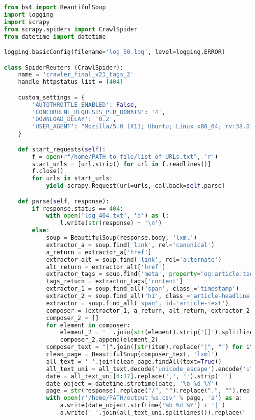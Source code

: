 \documentclass[12pt]{article}
\begin{document}
\begin{lstlisting}[language=Python,title=\textbf{Reuters data scraping.}]
from bs4 import BeautifulSoup
import logging
import scrapy
from scrapy.spiders import CrawlSpider
from datetime import datetime

logging.basicConfig(filename='log_50.log', level=logging.ERROR)

class SpiderReuters (CrawlSpider):
    name = 'crawler_final_v21_tags_2'
    handle_httpstatus_list = [404]

    custom_settings = {
        'AUTOTHROTTLE_ENABLED': False,
        'CONCURRENT_REQUESTS_PER_DOMAIN': '4',
        'DOWNLOAD_DELAY': '0.2',
        'USER_AGENT': "Mozilla/5.0 (X11; Ubuntu; Linux x86_64; rv:38.0) Gecko/20100101 Firefox/38.0"
    }

    def start_requests(self):
        f = open(r"/home/PATH-to-file/list_of_URLs.txt", 'r')
        start_urls = [url.strip() for url in f.readlines()]
        f.close()
        for urls in start_urls:
            yield scrapy.Request(url=urls, callback=self.parse)

    def parse(self, response):
        if response.status == 404:
            with open('log_404.txt', 'a') as l:
                l.write(str(response) + '\n')
        else:
            soup = BeautifulSoup(response.body, 'lxml')
            extractor_a = soup.find('link', rel='canonical')
            a_return = extractor_a['href']
            extractor_alt = soup.find('link', rel='alternate')
            alt_return = extractor_alt['href']
            extractor_tags = soup.find('meta', property="og:article:tag")
            tags_return = extractor_tags['content']
            extractor_1 = soup.find_all('span', class_='timestamp')
            extractor_2 = soup.find_all('h1', class_='article-headline')
            extractor = soup.find_all('span', id='article-text')
            composer = [extractor_1, a_return, alt_return, extractor_2, extractor, tags_return]
            composer_2 = []
            for element in composer:
                element_2 = ' '.join(str(element).strip('[]').splitlines())
                composer_2.append(element_2)
            composer_text = "|".join([str(item).replace("|", "") for item in composer_2])
            clean_page = BeautifulSoup(composer_text, 'lxml')
            all_text = ' '.join(clean_page.findAll(text=True))
            all_text_uni = all_text.decode('unicode_escape').encode('utf-8', 'strict')
            date = all_text_uni[4:17].replace(',', '').strip(' ')
            date_object = datetime.strptime(date, '%b %d %Y')
            page = str(response).replace("/", "").replace(".", "").replace(":", "").replace("<", "").replace(">", "")
            with open(r'/home/PATH/output_%s.csv' % page, 'a') as a:
                a.write(date_object.strftime('%b %d %Y') + '|')
                a.write(' '.join(all_text_uni.splitlines()).replace("  ", " "))
\end{lstlisting}
\end{document}
